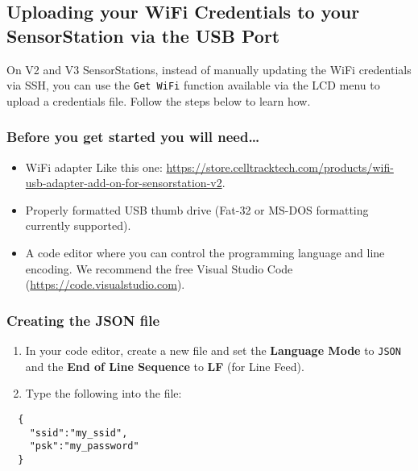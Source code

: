\documentclass[
]{article}
\providecommand{\tightlist}{%
  \setlength{\itemsep}{0pt}\setlength{\parskip}{0pt}}
\begin{document}
\hypertarget{uploading-your-wifi-credentials-to-your-sensorstation-via-the-usb-port}{%
\subsection{Uploading your WiFi Credentials to your SensorStation via
the USB
Port}\label{uploading-your-wifi-credentials-to-your-sensorstation-via-the-usb-port}}

On V2 and V3 SensorStations, instead of manually updating the WiFi
credentials via SSH, you can use the \texttt{Get\ WiFi} function
available via the LCD menu to upload a credentials file. Follow the
steps below to learn how.

\hypertarget{before-you-get-started-you-will-need-2}{%
\subsubsection{Before you get started you will
need\ldots{}}\label{before-you-get-started-you-will-need-2}}

\begin{itemize}
\tightlist
\item
  WiFi adapter Like this one:
  \url{https://store.celltracktech.com/products/wifi-usb-adapter-add-on-for-sensorstation-v2}.
\item
  Properly formatted USB thumb drive (Fat-32 or MS-DOS formatting
  currently supported).
\item
  A code editor where you can control the programming language and line
  encoding. We recommend the free Visual Studio Code
  (\url{https://code.visualstudio.com}).
\end{itemize}

\hypertarget{creating-the-json-file}{%
\subsubsection{Creating the JSON file}\label{creating-the-json-file}}

\begin{enumerate}
\def\labelenumi{\arabic{enumi}.}
\tightlist
\item
  In your code editor, create a new file and set the \textbf{Language
  Mode} to \texttt{JSON} and the \textbf{End of Line Sequence} to
  \textbf{LF} (for Line Feed).
\item
  Type the following into the file:
\end{enumerate}

\begin{verbatim}
  {
    "ssid":"my_ssid",
    "psk":"my_password" 
  }
\end{verbatim}
\end{document}
